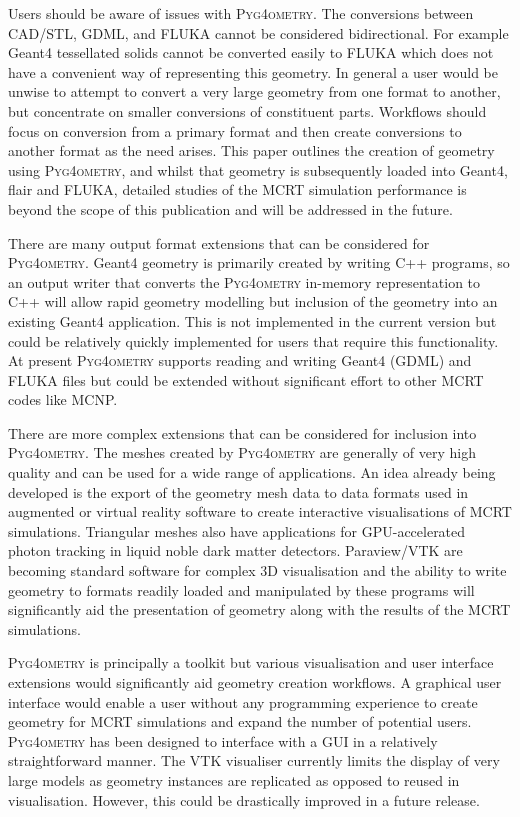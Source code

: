 \documentclass[final,5p,times,twocolumn]{elsarticle}
\newcommand{\PYGEOMETRY}{\textsc{Pyg4ometry}}
\begin{document}
Users should be aware of issues with \PYGEOMETRY{}. The conversions between CAD/STL, GDML, and FLUKA 
cannot be considered bidirectional. For example Geant4 tessellated solids cannot be converted easily to FLUKA which does not 
have a convenient way of representing this geometry. In general a user would be unwise to attempt to convert a very large 
geometry from one format to another, but concentrate on smaller conversions of constituent parts. Workflows should focus 
on conversion from a primary format and then create conversions to another format as the need arises. This paper outlines 
the creation of geometry using \PYGEOMETRY{}, and whilst that geometry is subsequently loaded into Geant4, flair and FLUKA, detailed 
studies of the MCRT simulation performance is beyond the scope of this publication and will be addressed in the future.

There are many output format extensions that can be considered for \PYGEOMETRY{}. 
Geant4 geometry is primarily created by writing C++ programs, so an output writer that 
converts the \PYGEOMETRY{} in-memory representation to C++ will allow rapid geometry 
modelling but inclusion of the geometry into an existing Geant4 application. This is not 
implemented in the current version but could be relatively quickly implemented for users that 
require this functionality. At present \PYGEOMETRY{} supports reading and writing 
Geant4 (GDML) and FLUKA files but could be extended without significant effort to other MCRT codes 
like MCNP. 

There are more complex extensions that can be considered for inclusion into \PYGEOMETRY{}.
The meshes created by \PYGEOMETRY{} are generally of very high quality and can be used for a 
wide range of applications. An idea already being developed is the export of the geometry mesh data to
data formats used in augmented or virtual reality software to create interactive visualisations of MCRT 
simulations.  Triangular meshes also have applications for GPU-accelerated photon tracking in 
liquid noble dark matter detectors. Paraview/VTK are becoming standard software for complex 3D visualisation and 
the ability to write geometry to formats readily loaded and manipulated by these programs will 
significantly aid the presentation of geometry along with the results of the MCRT simulations.

\PYGEOMETRY{} is principally a toolkit but various visualisation and user interface extensions would 
significantly aid geometry creation workflows. A graphical user interface would enable a user without any
 programming experience to create geometry for MCRT simulations and expand the number of potential users.
\PYGEOMETRY{} has been designed to interface with a GUI in a relatively straightforward manner. The VTK visualiser currently 
limits the display of very large models as geometry instances are replicated as opposed to reused in visualisation.  However,
this could be drastically improved in a future release.
\end{document}
